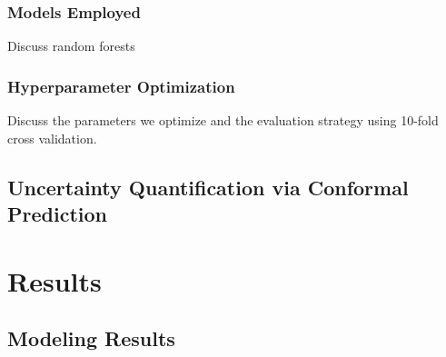\documentclass[journal,article,submit,pdftex,moreauthors]{Definitions/mdpi}
\begin{document}
\subsubsection{Models Employed}
Discuss random forests
\subsubsection{Hyperparameter Optimization}
Discuss the parameters we optimize and the evaluation strategy using 10-fold cross validation.

\subsection{Uncertainty Quantification via Conformal Prediction}


\section{Results}

\subsection{Modeling Results}
\end{document}

